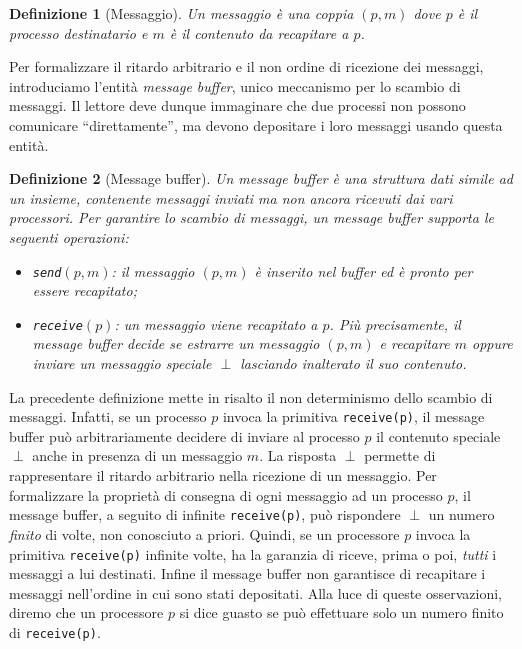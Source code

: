 \documentclass{article}
\newtheorem{definizione}{Definizione}
\begin{document}
\begin{definizione}[Messaggio]
  Un messaggio è una coppia $(p,m)$ dove $p$ è il processo
  destinatario e $m$ è il contenuto da recapitare a $p$.
\end{definizione}

Per formalizzare il ritardo arbitrario e il non ordine di ricezione
dei messaggi, introduciamo l'entit\`a \emph{message buffer}, unico
meccanismo per lo scambio di messaggi. Il lettore deve dunque
immaginare che due processi non possono comunicare ``direttamente'',
ma devono depositare i loro messaggi usando questa entit\`a.

\begin{definizione}[Message buffer]
  Un \emph{message buffer} \`e una struttura dati simile ad un
  insieme, contenente messaggi inviati ma non ancora ricevuti dai vari
  processori. Per garantire lo scambio di messaggi, un message buffer
  supporta le seguenti operazioni:
\begin{itemize}
\item \texttt{send$(p,m)$}: il messaggio $(p,m)$ è inserito nel buffer
  ed è pronto per essere recapitato;
\item \texttt{receive$(p)$}: un messaggio viene recapitato a $p$. Più
  precisamente, il message buffer decide se estrarre un messaggio
  $(p,m)$ e recapitare $m$ oppure inviare un messaggio speciale
  $\perp$ lasciando inalterato il suo contenuto.
\end{itemize}
\end{definizione}
La precedente definizione mette in risalto il non determinismo dello
scambio di messaggi. Infatti, se un processo $p$ invoca la primitiva
\texttt{receive(p)}, il message buffer può arbitrariamente decidere di
inviare al processo $p$ il contenuto speciale $\perp$ anche in
presenza di un messaggio $m$. La risposta $\perp$ permette di
rappresentare il ritardo arbitrario nella ricezione di un
messaggio. Per formalizzare la propriet\`a di consegna di ogni
messaggio ad un processo $p$, il message buffer, a seguito di infinite
\texttt{receive(p)}, può rispondere $\perp$ un numero \emph{finito} di
volte, non conosciuto a priori. Quindi, se un processore $p$ invoca la
primitiva \texttt{receive(p)} infinite volte, ha la garanzia di
riceve, prima o poi, \emph{tutti} i messaggi a lui destinati. Infine
il message buffer non garantisce di recapitare i messaggi nell'ordine
in cui sono stati depositati. Alla luce di queste osservazioni, diremo
che un processore $p$ si dice guasto se può effettuare solo un numero
finito di \texttt{receive(p)}.
\end{document}
